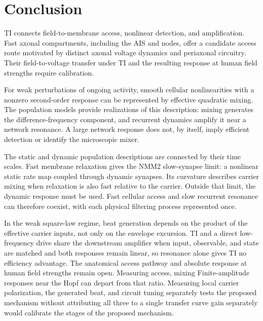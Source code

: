 \documentclass[11pt,a4paper]{article}
\providecommand{\DIFaddtex}[1]{{\protect\color{blue} \sf #1}} %
\providecommand{\DIFdeltex}[1]{{\protect\color{red} \scriptsize #1}} %
\providecommand{\DIFaddbegin}{} %
\providecommand{\DIFaddend}{} %
\providecommand{\DIFdelbegin}{} %
\providecommand{\DIFdelend}{} %
\providecommand{\DIFadd}[1]{\texorpdfstring{\DIFaddtex{#1}}{#1}} %
\providecommand{\DIFdel}[1]{\texorpdfstring{\DIFdeltex{#1}}{}} %
\begin{document}
\section{Conclusion}
\DIFaddbegin \DIFadd{TI connects field-to-membrane access, nonlinear detection, and amplification.
Fast axonal compartments, including the AIS and nodes, offer a candidate access
route motivated by distinct axonal voltage dynamics and periaxonal circuitry.
Their field-to-voltage transfer under TI and the resulting response at human
field strengths require calibration.
}

\DIFaddend For weak perturbations of ongoing activity, smooth cellular nonlinearities with a nonzero
second-order response can be represented by effective quadratic mixing. The
population models provide realizations of this description: mixing generates
the difference-frequency component, and recurrent dynamics amplify it near a
network resonance. A large network response does not, by itself, imply efficient
detection or identify the microscopic mixer.

The static and dynamic population descriptions are connected by their time scales.
Fast membrane relaxation gives the NMM2 slow-synapse limit: a nonlinear static rate
map coupled through dynamic synapses. Its curvature describes carrier mixing when
relaxation is also fast relative to the carrier. Outside that limit, the dynamic
response must be used. Fast cellular access and slow recurrent resonance can
therefore coexist, with each physical filtering process represented once.

In the weak square-law regime, beat generation depends on the product of the
effective carrier inputs, not only on the envelope excursion. TI and a direct
low-frequency drive share the downstream amplifier when input, observable, and
state are matched \DIFaddbegin \DIFadd{and both responses remain linear}\DIFaddend , so resonance alone gives TI
no efficiency advantage. \DIFdelbegin \DIFdel{The
anatomical access pathway and absolute response at human field strengths remain
open. Measuring access, mixing}\DIFdelend \DIFaddbegin \DIFadd{Finite-amplitude responses near the Hopf can depart from
that ratio. Measuring local carrier polarization, the generated beat}\DIFaddend , and circuit
\DIFdelbegin \DIFdel{tuning separately tests the proposed
mechanism without attributing all three to a single transfer curve}\DIFdelend \DIFaddbegin \DIFadd{gain separately would calibrate the stages of the proposed mechanism}\DIFaddend .
\end{document}
